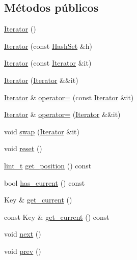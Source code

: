 \subsection*{Métodos públicos}
\begin{DoxyCompactItemize}
\item 
\hyperlink{class_designar_1_1_hash_set_1_1_iterator_a35f9b2ac54be788fa6c2b8a274c7e308}{Iterator} ()
\item 
\hyperlink{class_designar_1_1_hash_set_1_1_iterator_a1047f02ec4c3bfd5919ef66b28ca537c}{Iterator} (const \hyperlink{class_designar_1_1_hash_set}{Hash\+Set} \&h)
\item 
\hyperlink{class_designar_1_1_hash_set_1_1_iterator_addcd6728c590ea206dd13d9f0724bbcd}{Iterator} (const \hyperlink{class_designar_1_1_hash_set_1_1_iterator}{Iterator} \&it)
\item 
\hyperlink{class_designar_1_1_hash_set_1_1_iterator_a7adf1abf361e03423317b2e36eb76f1f}{Iterator} (\hyperlink{class_designar_1_1_hash_set_1_1_iterator}{Iterator} \&\&it)
\item 
\hyperlink{class_designar_1_1_hash_set_1_1_iterator}{Iterator} \& \hyperlink{class_designar_1_1_hash_set_1_1_iterator_a8e8fce4e60beb6933dd5d13b39d67493}{operator=} (const \hyperlink{class_designar_1_1_hash_set_1_1_iterator}{Iterator} \&it)
\item 
\hyperlink{class_designar_1_1_hash_set_1_1_iterator}{Iterator} \& \hyperlink{class_designar_1_1_hash_set_1_1_iterator_a5856c1a7f46a0c4e2899acff687fdf13}{operator=} (\hyperlink{class_designar_1_1_hash_set_1_1_iterator}{Iterator} \&\&it)
\item 
void \hyperlink{class_designar_1_1_hash_set_1_1_iterator_a5849b111320c33206baef1926cb3f156}{swap} (\hyperlink{class_designar_1_1_hash_set_1_1_iterator}{Iterator} \&it)
\item 
void \hyperlink{class_designar_1_1_hash_set_1_1_iterator_a4563f0da2eaf8dc2b4879cc959f7c277}{reset} ()
\item 
\hyperlink{namespace_designar_a9d113d66a39e82b73727c72cd3a52f73}{lint\+\_\+t} \hyperlink{class_designar_1_1_hash_set_1_1_iterator_a12b236661945aa10228f0523b6e1ab5e}{get\+\_\+position} () const
\item 
bool \hyperlink{class_designar_1_1_hash_set_1_1_iterator_a13dc6ab67d6d4a380e2f1cb4fd6d3ae2}{has\+\_\+current} () const
\item 
Key \& \hyperlink{class_designar_1_1_hash_set_1_1_iterator_af954a7cf3f23fecf898b86030e808224}{get\+\_\+current} ()
\item 
const Key \& \hyperlink{class_designar_1_1_hash_set_1_1_iterator_aed6b09996733067a2aa5e48b702ba9a2}{get\+\_\+current} () const
\item 
void \hyperlink{class_designar_1_1_hash_set_1_1_iterator_a13eaec913faa009d4d002c25965d67d7}{next} ()
\item 
void \hyperlink{class_designar_1_1_hash_set_1_1_iterator_a678b8d6f21627b05cbde7d11da64a010}{prev} ()
\end{DoxyCompactItemize}
